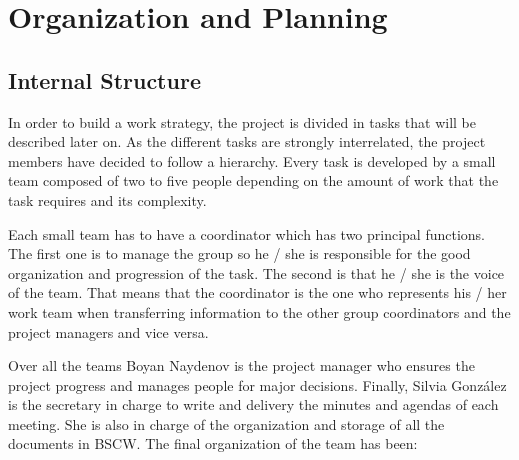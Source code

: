 \chapter{Organization and Planning}
\newpage
\section{Internal Structure}

In order to build a work strategy, the project is divided in tasks that will be described later on. As the different tasks are strongly interrelated, the project members have decided to follow a hierarchy. Every task is developed by a small team composed of two to five people depending on the amount of work that the task requires and its complexity.
\newline

Each small team has to have a coordinator which has two principal functions. The first one is to manage the group so he / she is responsible for the good organization and progression of the task. The second is that he / she is the voice of the team. That means that the coordinator is the one who represents his / her work team when transferring information to the other group coordinators and the project managers and vice versa.
\newline

Over all the teams Boyan Naydenov is the project manager who ensures the project progress and manages people for major decisions. Finally, Silvia Gonz\'{a}lez is the secretary in charge to write and delivery the minutes and agendas of each meeting. She is also in charge of the organization and storage of all the documents in BSCW. \newline The final organization of the team has been:
 
